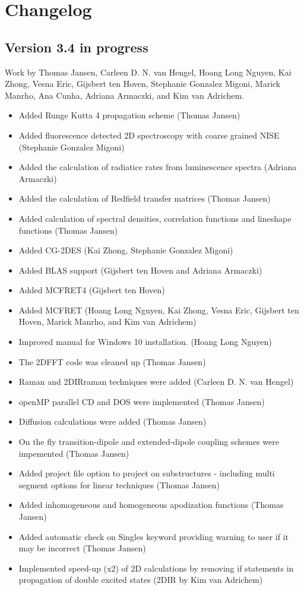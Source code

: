 \section{Changelog}
\subsection{Version 3.4 in progress}
{\small Work by Thomas Jansen, Carleen D. N. van Hengel, Hoang Long Nguyen, Kai Zhong,
Vesna Eric, Gijsbert ten Hoven, Stephanie Gonzalez Migoni, Marick Manrho, Ana Cunha,
Adriana Armaczki, and Kim van Adrichem.}
\begin{itemize}
\item Added Runge Kutta 4 propagation scheme (Thomas Jansen)
\item Added fluorescence detected 2D spectroscopy with coarse grained NISE (Stephanie Gonzalez Migoni)
\item Added the calculation of radiatice rates from luminescence spectra (Adriana Armaczki)
\item Added the calculation of Redfield transfer matrices (Thomas Jansen)
\item Added calculation of spectral densities, correlation functions and lineshape functions (Thomas Jansen)
\item Added CG-2DES (Kai Zhong, Stephanie Gonzalez Migoni)
\item Added BLAS support (Gijsbert ten Hoven and Adriana Armaczki)
\item Added MCFRET4 (Gijsbert ten Hoven)
\item Added MCFRET (Hoang Long Nguyen, Kai Zhong, Vesna Eric, Gijsbert ten Hoven, Marick Manrho, and Kim van Adrichem)
\item Improved manual for Windows 10 installation. (Hoang Long Nguyen)
\item The 2DFFT code was cleaned up (Thomas Jansen)
\item Raman and 2DIRraman techniques were added (Carleen D. N. van Hengel)
\item openMP parallel CD and DOS were implemented (Thomas Jansen)
\item Diffusion calculations were added (Thomas Jansen)
\item On the fly transition-dipole and extended-dipole coupling schemes were impemented (Thomas Jansen)
\item Added project file option to project on substructures - including multi segment options for linear techniques (Thomas Jansen)
\item Added inhomogeneous and homogeneous apodization functions (Thomas Jansen)
\item Added automatic check on Singles keyword providing warning to user if it may be incorrect (Thomas Jansen)
\item Implemented speed-up (x2) of 2D calculations by removing if statements in propagation of double excited states (2DIR by Kim van Adrichem)
\end{itemize}

